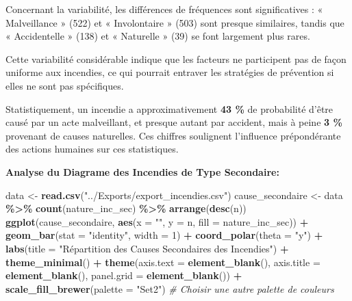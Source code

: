 \documentclass[
]{article}
\newenvironment{Shaded}{\begin{snugshade}}{\end{snugshade}}
\newcommand{\AttributeTok}[1]{\textcolor[rgb]{0.13,0.29,0.53}{#1}}
\newcommand{\CommentTok}[1]{\textcolor[rgb]{0.56,0.35,0.01}{\textit{#1}}}
\newcommand{\DecValTok}[1]{\textcolor[rgb]{0.00,0.00,0.81}{#1}}
\newcommand{\FunctionTok}[1]{\textcolor[rgb]{0.13,0.29,0.53}{\textbf{#1}}}
\newcommand{\NormalTok}[1]{#1}
\newcommand{\OtherTok}[1]{\textcolor[rgb]{0.56,0.35,0.01}{#1}}
\newcommand{\SpecialCharTok}[1]{\textcolor[rgb]{0.81,0.36,0.00}{\textbf{#1}}}
\newcommand{\StringTok}[1]{\textcolor[rgb]{0.31,0.60,0.02}{#1}}
\begin{document}
Concernant la variabilité, les différences de fréquences sont
significatives : « Malveillance » (522) et « Involontaire » (503) sont
presque similaires, tandis que « Accidentelle » (138) et « Naturelle »
(39) se font largement plus rares.

Cette variabilité considérable indique que les facteurs ne participent
pas de façon uniforme aux incendies, ce qui pourrait entraver les
stratégies de prévention si elles ne sont pas spécifiques.

Statistiquement, un incendie a approximativement \textbf{43 \%} de
probabilité d'être causé par un acte malveillant, et presque autant par
accident, mais à peine \textbf{3 \%} provenant de causes naturelles. Ces
chiffres soulignent l'influence prépondérante des actions humaines sur
ces statistiques.

\textbf{Analyse du Diagrame des Incendies de Type Secondaire:}

\begin{Shaded}
\begin{Highlighting}[]
\NormalTok{data }\OtherTok{\textless{}{-}} \FunctionTok{read.csv}\NormalTok{(}\StringTok{"../Exports/export\_incendies.csv"}\NormalTok{)}
\NormalTok{cause\_secondaire }\OtherTok{\textless{}{-}}\NormalTok{ data }\SpecialCharTok{\%\textgreater{}\%}
  \FunctionTok{count}\NormalTok{(nature\_inc\_sec) }\SpecialCharTok{\%\textgreater{}\%}
  \FunctionTok{arrange}\NormalTok{(}\FunctionTok{desc}\NormalTok{(n))}
\FunctionTok{ggplot}\NormalTok{(cause\_secondaire, }\FunctionTok{aes}\NormalTok{(}\AttributeTok{x =} \StringTok{""}\NormalTok{, }\AttributeTok{y =}\NormalTok{ n, }\AttributeTok{fill =}\NormalTok{ nature\_inc\_sec)) }\SpecialCharTok{+}
  \FunctionTok{geom\_bar}\NormalTok{(}\AttributeTok{stat =} \StringTok{"identity"}\NormalTok{, }\AttributeTok{width =} \DecValTok{1}\NormalTok{) }\SpecialCharTok{+}
  \FunctionTok{coord\_polar}\NormalTok{(}\AttributeTok{theta =} \StringTok{"y"}\NormalTok{) }\SpecialCharTok{+}
  \FunctionTok{labs}\NormalTok{(}\AttributeTok{title =} \StringTok{"Répartition des Causes Secondaires des Incendies"}\NormalTok{) }\SpecialCharTok{+}
  \FunctionTok{theme\_minimal}\NormalTok{() }\SpecialCharTok{+}
  \FunctionTok{theme}\NormalTok{(}\AttributeTok{axis.text =} \FunctionTok{element\_blank}\NormalTok{(),}
        \AttributeTok{axis.title =} \FunctionTok{element\_blank}\NormalTok{(),}
        \AttributeTok{panel.grid =} \FunctionTok{element\_blank}\NormalTok{()) }\SpecialCharTok{+}
  \FunctionTok{scale\_fill\_brewer}\NormalTok{(}\AttributeTok{palette =} \StringTok{"Set2"}\NormalTok{) }\CommentTok{\# Choisir une autre palette de couleurs}
\end{Highlighting}
\end{Shaded}
\end{document}
